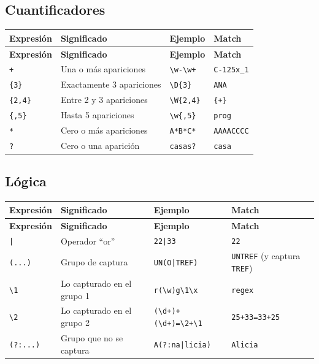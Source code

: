 \documentclass[a4paper, 8pt]{extarticle}
\begin{document}
\subsection*{Cuantificadores}

\begin{longtable}{@{} p{2cm} p{7.5cm} p{3cm} p{5cm} @{}}
\toprule
\textbf{Expresión} & \textbf{Significado} & \textbf{Ejemplo} & \textbf{Match} \\
\midrule
\endfirsthead
\toprule
\textbf{Expresión} & \textbf{Significado} & \textbf{Ejemplo} & \textbf{Match} \\
\midrule
\endhead
\bottomrule
\endfoot
\bottomrule
\endlastfoot

\centering \verb!+!     & Una o más apariciones     & \verb!\w-\w+!  & \verb!C-125x_1! \\
\centering \verb!{3}!   & Exactamente 3 apariciones & \verb!\D{3}!   & \verb!ANA!      \\
\centering \verb!{2,4}! & Entre 2 y 3 apariciones   & \verb!\W{2,4}! & \verb!{+}!      \\
\centering \verb!{,5}!  & Hasta 5 apariciones       & \verb!\w{,5}!  & \verb!prog!     \\
\centering \verb!*!     & Cero o más apariciones    & \verb!A*B*C*!  & \verb!AAAACCCC! \\
\centering \verb!?!     & Cero o una aparición      & \verb!casas?!  & \verb!casa!     \\
\end{longtable}


\subsection*{Lógica}

\begin{longtable}{@{} p{2cm} p{7.5cm} p{3cm} p{5cm} @{}}
\toprule
\textbf{Expresión} & \textbf{Significado} & \textbf{Ejemplo} & \textbf{Match} \\
\midrule
\endfirsthead
\toprule
\textbf{Expresión} & \textbf{Significado} & \textbf{Ejemplo} & \textbf{Match} \\
\midrule
\endhead
\bottomrule
\endfoot
\bottomrule
\endlastfoot

\centering \verb!|!       & Operador ``or''            & \verb!22|33!             & \verb!22!                             \\
\centering \verb!(...)!   & Grupo de captura           & \verb!UN(O|TREF)!        & \verb!UNTREF! (y captura \verb!TREF!) \\
\centering \verb!\1!      & Lo capturado en el grupo 1 & \verb!r(\w)g\1\x!        & \verb!regex!                          \\
\centering \verb!\2!      & Lo capturado en el grupo 2 & \verb!(\d+)+(\d+)=\2+\1! & \verb!25+33=33+25!                    \\
\centering \verb!(?:...)! & Grupo que no se captura    & \verb!A(?:na|licia)!     & \verb!Alicia!                         \\
\end{longtable}
\end{document}

